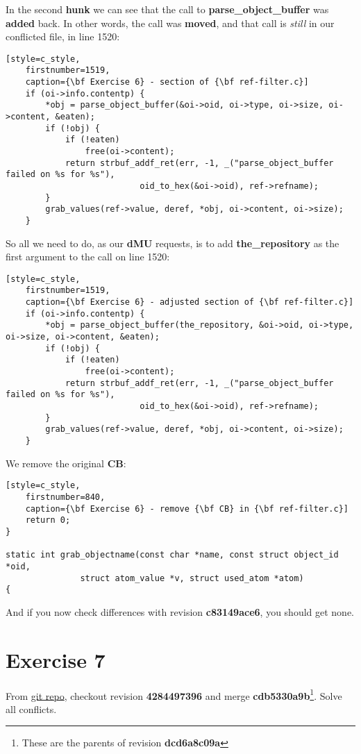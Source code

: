 In the second {\bf hunk} we can see that the call to {\bf parse\_object\_buffer} was {\bf added} back. In other words,
the call was {\bf moved}, and that call is {\it still} in our conflicted file, in line 1520:
\begin{lstlisting}[style=c_style,
	firstnumber=1519,
	caption={\bf Exercise 6} - section of {\bf ref-filter.c}]
	if (oi->info.contentp) {
		*obj = parse_object_buffer(&oi->oid, oi->type, oi->size, oi->content, &eaten);
		if (!obj) {
			if (!eaten)
				free(oi->content);
			return strbuf_addf_ret(err, -1, _("parse_object_buffer failed on %s for %s"),
					       oid_to_hex(&oi->oid), ref->refname);
		}
		grab_values(ref->value, deref, *obj, oi->content, oi->size);
	}
\end{lstlisting}

So all we need to do, as our {\bf dMU} requests, is to add {\bf the\_repository} as the first argument
to the call on line 1520:
\begin{lstlisting}[style=c_style,
	firstnumber=1519,
	caption={\bf Exercise 6} - adjusted section of {\bf ref-filter.c}]
	if (oi->info.contentp) {
		*obj = parse_object_buffer(the_repository, &oi->oid, oi->type, oi->size, oi->content, &eaten);
		if (!obj) {
			if (!eaten)
				free(oi->content);
			return strbuf_addf_ret(err, -1, _("parse_object_buffer failed on %s for %s"),
					       oid_to_hex(&oi->oid), ref->refname);
		}
		grab_values(ref->value, deref, *obj, oi->content, oi->size);
	}
\end{lstlisting}

We remove the original {\bf CB}:
\begin{lstlisting}[style=c_style,
	firstnumber=840,
	caption={\bf Exercise 6} - remove {\bf CB} in {\bf ref-filter.c}]
	return 0;
}

static int grab_objectname(const char *name, const struct object_id *oid,
			   struct atom_value *v, struct used_atom *atom)
{
\end{lstlisting}

And if you now check differences with revision {\bf c83149ace6}, you should get none.

\section{Exercise 7}
\label{exercise_07}

From \hyperref[git_repo]{git repo}, checkout revision {\bf 4284497396} and merge {\bf cdb5330a9b}\footnote{These are the
parents of revision {\bf dcd6a8c09a}}. Solve all conflicts.

